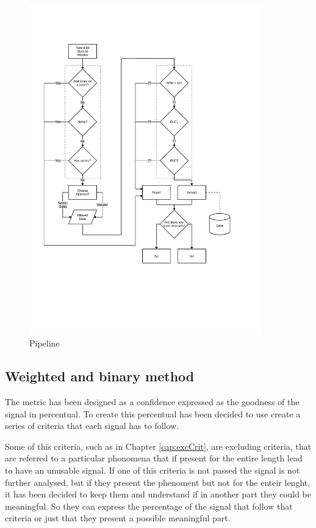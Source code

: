 \begin{figure}[p]
    \centering
    \includegraphics[width=0.9\textwidth]{img/pipeline.pdf}
    \caption{Pipeline}
    \label{fig:pipeline}
\end{figure}

\subsection{Weighted and binary method}
The metric has been designed as a confidence expressed as the goodness of the signal in percentual. To create this percentual has been decided to use create a series of criteria that each signal has to follow. 

Some of this criteria, such as in Chapter \ref{cap:excCrit}, are excluding criteria, that are referred to a particular phonomena that if present for the entire length lead to have an unusable signal.
If one of this criteria is not passed the signal is not further analysed, but if they present the phenoment but not for the enteir lenght, it has been decided to keep them and understand if in another part they could be meaningful. So they can express the percentage of the signal that follow that criteria or just that they present a possible meaningful part. 

